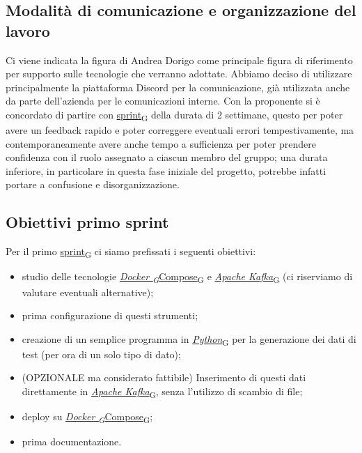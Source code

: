 \documentclass[italian,12pt]{article}
\begin{document}
\subsection{Modalità di comunicazione e organizzazione del lavoro}
Ci viene indicata la figura di Andrea Dorigo come principale figura di riferimento per 
supporto sulle tecnologie che verranno adottate. Abbiamo deciso di utilizzare principalmente 
la piattaforma Discord per la comunicazione, già utilizzata anche da parte dell'azienda per 
le comunicazioni interne. Con la proponente si è concordato di partire con \href{https://7last.github.io/docs/rtb/documentazione-interna/glossario#sprint}{sprint\textsubscript{G}} della durata 
di 2 settimane, questo per poter avere un feedback rapido e poter correggere eventuali errori 
tempestivamente, ma contemporaneamente avere anche tempo a sufficienza per poter prendere confidenza 
con il ruolo assegnato a ciascun membro del gruppo; una durata inferiore, in particolare 
in questa fase iniziale del progetto, potrebbe infatti portare a confusione e disorganizzazione.

\subsection{Obiettivi primo sprint}
Per il primo \href{https://7last.github.io/docs/rtb/documentazione-interna/glossario#sprint}{sprint\textsubscript{G}} ci siamo prefissati i seguenti obiettivi:
\begin{itemize}
	\item studio delle tecnologie \href{https://7last.github.io/docs/rtb/documentazione-interna/glossario#docker-compose}{\href{https://7last.github.io/docs/rtb/documentazione-interna/glossario#docker}{\textit{Docker \textsubscript{G}}Compose}\textsubscript{G}} e \href{https://7last.github.io/docs/rtb/documentazione-interna/glossario#apache-kafka}{\textit{Apache Kafka}\textsubscript{G}} (ci riserviamo di valutare eventuali alternative);
	\item prima configurazione di questi strumenti;
	\item creazione di un semplice programma in \href{https://7last.github.io/docs/rtb/documentazione-interna/glossario#python}{\textit{Python}\textsubscript{G}} per la generazione dei dati di test (per ora di un solo tipo di dato);
	\item (OPZIONALE ma considerato fattibile) Inserimento di questi dati direttamente in \href{https://7last.github.io/docs/rtb/documentazione-interna/glossario#apache-kafka}{\textit{Apache Kafka}\textsubscript{G}}, senza l'utilizzo di scambio di file;
	\item deploy su \href{https://7last.github.io/docs/rtb/documentazione-interna/glossario#docker-compose}{\href{https://7last.github.io/docs/rtb/documentazione-interna/glossario#docker}{\textit{Docker \textsubscript{G}}Compose}\textsubscript{G}};
	\item prima documentazione.
\end{itemize}
\end{document}
